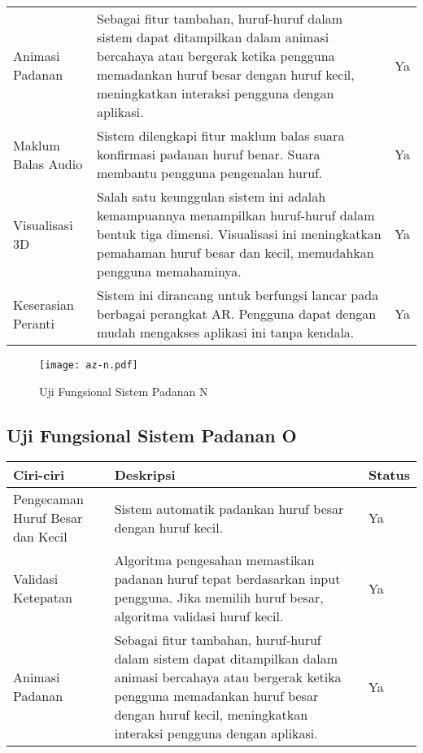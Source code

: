 \begin{itemize}
\begin{itemize}
\begin{itemize}
\begin{itemize}
\begin{itemize}
\begin{itemize}
\begin{itemize}
\begin{itemize}
\begin{flushleft}
\begin{tabular}{>{\raggedright}p{3cm}p{9cm}>{\raggedright\arraybackslash}p{2cm}}
Animasi Padanan & Sebagai fitur tambahan, huruf-huruf dalam sistem dapat ditampilkan dalam animasi bercahaya atau bergerak ketika pengguna memadankan huruf besar dengan huruf kecil, meningkatkan interaksi pengguna dengan aplikasi. & Ya \\

Maklum Balas Audio & Sistem dilengkapi fitur maklum balas suara konfirmasi padanan huruf benar. Suara membantu pengguna pengenalan huruf. & Ya \\

Visualisasi 3D & Salah satu keunggulan sistem ini adalah kemampuannya menampilkan huruf-huruf dalam bentuk tiga dimensi. Visualisasi ini meningkatkan pemahaman huruf besar dan kecil, memudahkan pengguna memahaminya. & Ya \\

Keserasian Peranti & Sistem ini dirancang untuk berfungsi lancar pada berbagai perangkat AR. Pengguna dapat dengan mudah mengakses aplikasi ini tanpa kendala. & Ya \\
\bottomrule
\end{tabular}

\begin{figure}
    \centering
    \texttt{[image: az-n.pdf]}
    \caption{Uji Fungsional  Sistem Padanan N }
    \label{fig:az-n.pdf}
\end{figure}

\subsection{Uji Fungsional  Sistem Padanan O}

\begin{tabular}{>{\raggedright}p{3cm}p{9cm}>{\centering\arraybackslash}p{2cm}}
\toprule
\textbf{Ciri-ciri} & \textbf{Deskripsi} & \textbf{Status} \\
\midrule
Pengecaman Huruf Besar dan Kecil & Sistem automatik padankan huruf besar dengan huruf kecil. & Ya \\

Validasi Ketepatan & Algoritma pengesahan memastikan padanan huruf tepat berdasarkan input pengguna. Jika memilih huruf besar, algoritma validasi huruf kecil. & Ya \\

Animasi Padanan & Sebagai fitur tambahan, huruf-huruf dalam sistem dapat ditampilkan dalam animasi bercahaya atau bergerak ketika pengguna memadankan huruf besar dengan huruf kecil, meningkatkan interaksi pengguna dengan aplikasi. & Ya \\


\end{tabular}
\end{flushleft}
\end{itemize}
\end{itemize}
\end{itemize}
\end{itemize}
\end{itemize}
\end{itemize}
\end{itemize}
\end{itemize}
